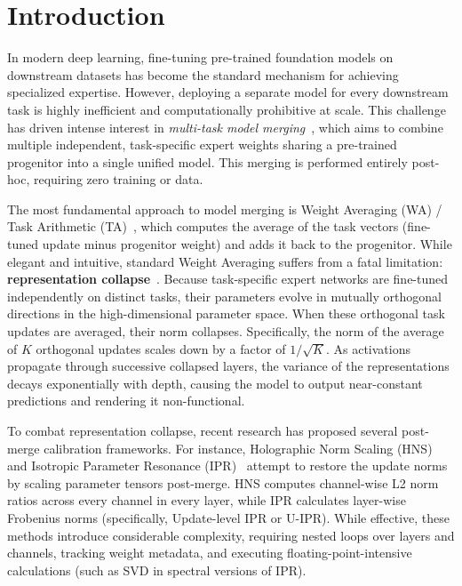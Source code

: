 \documentclass{article}
\theoremstyle{plain}
\theoremstyle{definition}
\theoremstyle{remark}
\begin{document}
\section{Introduction}
\label{sec:intro}

In modern deep learning, fine-tuning pre-trained foundation models on downstream datasets has become the standard mechanism for achieving specialized expertise. However, deploying a separate model for every downstream task is highly inefficient and computationally prohibitive at scale. This challenge has driven intense interest in \emph{multi-task model merging}~\cite{Wortsman2022Soups, Ilharco2022Editing}, which aims to combine multiple independent, task-specific expert weights sharing a pre-trained progenitor into a single unified model. This merging is performed entirely post-hoc, requiring zero training or data.

The most fundamental approach to model merging is Weight Averaging (WA) / Task Arithmetic (TA)~\cite{Ilharco2022Editing}, which computes the average of the task vectors (fine-tuned update minus progenitor weight) and adds it back to the progenitor. While elegant and intuitive, standard Weight Averaging suffers from a fatal limitation: \textbf{representation collapse}~\cite{jordan2023repair}. Because task-specific expert networks are fine-tuned independently on distinct tasks, their parameters evolve in mutually orthogonal directions in the high-dimensional parameter space. When these orthogonal task updates are averaged, their norm collapses. Specifically, the norm of the average of $K$ orthogonal updates scales down by a factor of $1 / \sqrt{K}$. As activations propagate through successive collapsed layers, the variance of the representations decays exponentially with depth, causing the model to output near-constant predictions and rendering it non-functional.

To combat representation collapse, recent research has proposed several post-merge calibration frameworks. For instance, Holographic Norm Scaling (HNS)~\cite{hns2025} and Isotropic Parameter Resonance (IPR)~\cite{ipr2025} attempt to restore the update norms by scaling parameter tensors post-merge. HNS computes channel-wise L2 norm ratios across every channel in every layer, while IPR calculates layer-wise Frobenius norms (specifically, Update-level IPR or U-IPR). While effective, these methods introduce considerable complexity, requiring nested loops over layers and channels, tracking weight metadata, and executing floating-point-intensive calculations (such as SVD in spectral versions of IPR).
\end{document}
